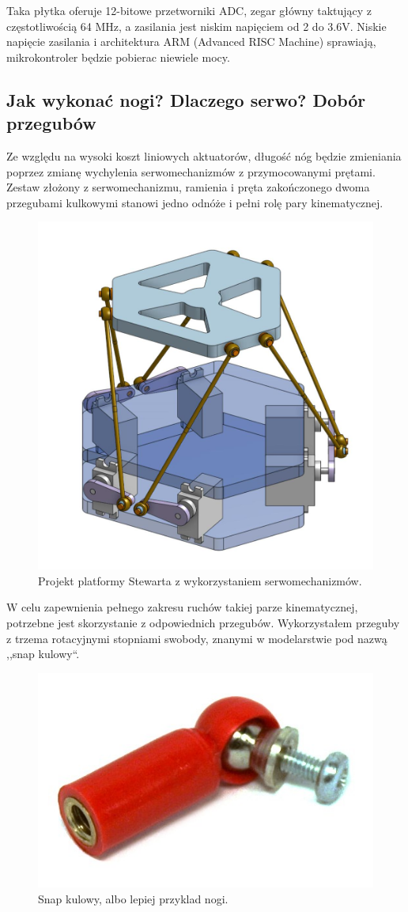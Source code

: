 Taka płytka oferuje 12-bitowe przetworniki ADC, zegar główny taktujący z częstotliwością 64 MHz, a zasilania jest niskim napięciem od 2 do 3.6V. Niskie napięcie zasilania i architektura ARM (Advanced RISC Machine) sprawiają, mikrokontroler będzie pobierac niewiele mocy.


\subsection{Jak wykonać nogi? Dlaczego serwo? Dobór przegubów}
Ze względu na wysoki koszt liniowych aktuatorów, długość nóg będzie zmieniania poprzez zmianę wychylenia serwomechanizmów z przymocowanymi prętami. Zestaw złożony z serwomechanizmu, ramienia i pręta zakończonego dwoma przegubami kulkowymi stanowi jedno odnóże i pełni rolę pary kinematycznej.

\begin{figure}[!h]
    \label{fig:anzelm}
    \centering
    \includegraphics[width=0.5\linewidth]{img/stewart_servo_github.jpg}
    \caption{Projekt platformy Stewarta z wykorzystaniem serwomechanizmów.}
\end{figure}


W celu zapewnienia pełnego zakresu ruchów takiej parze kinematycznej, potrzebne jest skorzystanie z odpowiednich przegubów. Wykorzystałem przeguby z trzema rotacyjnymi stopniami swobody, znanymi w modelarstwie pod nazwą ,,snap kulowy``.

\begin{figure}[!h]
    \label{fig:anzelm}
    \centering
    \includegraphics[width=0.5\linewidth]{img/snap_kulowy.jpg}
    \caption{Snap kulowy, albo lepiej przyklad nogi.}
\end{figure}

